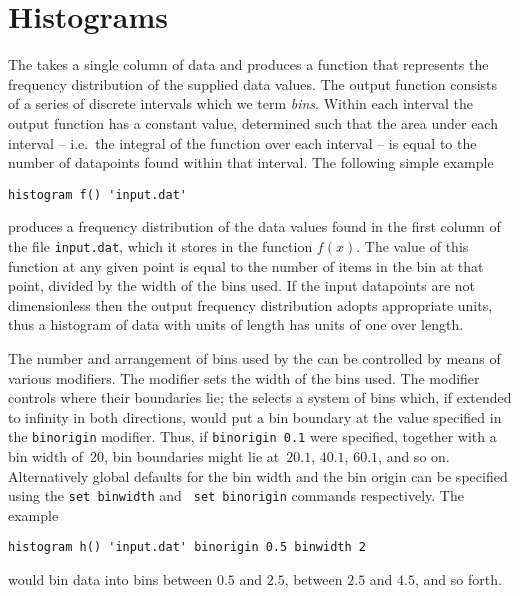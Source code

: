 \section{Histograms}
\label{sec:histogram}

The  takes a single column of data and produces a function
that represents the frequency distribution of the supplied data values. The
output function consists of a series of discrete intervals which we term {\it
bins}. Within each interval the output function has a constant value,
determined such that the area under each interval -- i.e.\ the integral of the
function over each interval -- is equal to the number of datapoints found
within that interval.  The following simple example

\begin{verbatim}
histogram f() 'input.dat'
\end{verbatim}

\noindent produces a frequency distribution of the data values found in the
first column of the file {\tt input.dat}, which it stores in the function
$f(x)$. The value of this function at any given point is equal to the number of
items in the bin at that point, divided by the width of the bins used. If the
input datapoints are not dimensionless then the output frequency distribution
adopts appropriate units, thus a histogram of data with units of length has
units of one over length.

The number and arrangement of bins used by the  can be
controlled by means of various modifiers.  The  modifier sets
the width of the bins used. The  modifier controls where
their boundaries lie; the  selects a system of bins which,
if extended to infinity in both directions, would put a bin boundary at the
value specified in the {\tt binorigin} modifier. Thus, if {\tt binorigin 0.1}
were specified, together with a bin width of~20, bin boundaries might lie
at~$20.1$, $40.1$, $60.1$, and so on. Alternatively global defaults for the bin
width and the bin origin can be specified using the {\tt set binwidth} and {\tt
set binorigin} commands respectively. The example

\begin{verbatim}
histogram h() 'input.dat' binorigin 0.5 binwidth 2
\end{verbatim}

\noindent would bin data into bins between $0.5$ and $2.5$, between $2.5$ and
$4.5$, and so forth.

